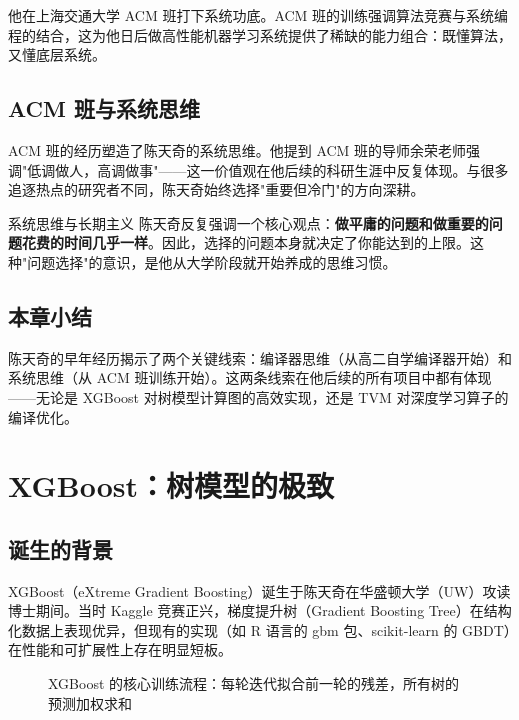 \documentclass[a4paper]{article}
\begin{document}
他在上海交通大学 ACM 班打下系统功底。ACM 班的训练强调算法竞赛与系统编程的结合，这为他日后做高性能机器学习系统提供了稀缺的能力组合：既懂算法，又懂底层系统。

\subsection{ACM 班与系统思维}

ACM 班的经历塑造了陈天奇的系统思维。他提到 ACM 班的导师余荣老师强调"低调做人，高调做事"——这一价值观在他后续的科研生涯中反复体现。与很多追逐热点的研究者不同，陈天奇始终选择"重要但冷门"的方向深耕。

\begin{importantbox}{系统思维与长期主义}
陈天奇反复强调一个核心观点：\textbf{做平庸的问题和做重要的问题花费的时间几乎一样}。因此，选择的问题本身就决定了你能达到的上限。这种"问题选择"的意识，是他从大学阶段就开始养成的思维习惯。
\end{importantbox}

\subsection{本章小结}

陈天奇的早年经历揭示了两个关键线索：编译器思维（从高二自学编译器开始）和系统思维（从 ACM 班训练开始）。这两条线索在他后续的所有项目中都有体现——无论是 XGBoost 对树模型计算图的高效实现，还是 TVM 对深度学习算子的编译优化。

\section{XGBoost：树模型的极致}

\subsection{诞生的背景}

XGBoost（eXtreme Gradient Boosting）诞生于陈天奇在华盛顿大学（UW）攻读博士期间。当时 Kaggle 竞赛正兴，梯度提升树（Gradient Boosting Tree）在结构化数据上表现优异，但现有的实现（如 R 语言的 gbm 包、scikit-learn 的 GBDT）在性能和可扩展性上存在明显短板。

\begin{figure}[H]
\centering
{}
\caption{XGBoost 的核心训练流程：每轮迭代拟合前一轮的残差，所有树的预测加权求和}
\end{figure}
\end{document}
